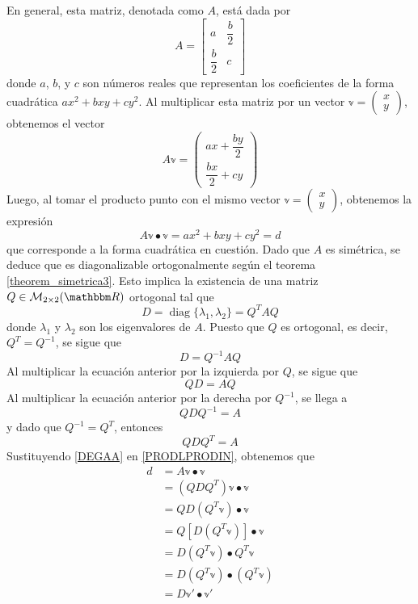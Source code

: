 En general, esta matriz, denotada como $A$, está dada por
\begin{equation}
    A = \begin{bmatrix} a & \dfrac{b}{2} \\[1.5mm] \dfrac{b}{2} & c \end{bmatrix} \label{AMATSIM}
\end{equation}
donde $a$, $b$, y $c$ son números reales que representan los coeficientes de la forma cuadrática $ax^2 + bxy + cy^2$. Al multiplicar esta matriz por un vector $\mathbb{v} = \begin{pmatrix} x \\ y \end{pmatrix}$, obtenemos el vector
$$A\mathbb{v} = \begin{pmatrix} ax + \dfrac{by}{2} \\[2mm] \dfrac{bx}{2} + cy \end{pmatrix}$$
Luego, al tomar el producto punto con el mismo vector $\mathbb{v} = \begin{pmatrix} x \\ y \end{pmatrix}$, obtenemos la expresión
\begin{equation}
    A\mathbb{v} \bullet \mathbb{v} = ax^2 + bxy + cy^2 = d \label{PRODLPRODIN}
\end{equation}
que corresponde a la forma cuadrática en cuestión. Dado que $A$ es simétrica, se deduce que es diagonalizable ortogonalmente según el teorema \ref{theorem_simetrica3}. Esto implica la existencia de una matriz $Q \in \mathcal{M}_{2 \times 2}(\RR)$ ortogonal tal que
$$D = \operatorname{diag} \{ \lambda_1, \lambda_2 \} = Q^T A Q$$\newpage\noindent
donde $\lambda_1$ y $\lambda_2$ son los eigenvalores de $A$. Puesto que $Q$ es ortogonal, es decir, $Q^T = Q^{-1}$, se sigue que
$$D = Q^{-1}AQ$$
Al multiplicar la ecuación anterior por la izquierda por $Q$, se sigue que
$$QD = AQ$$
Al multiplicar la ecuación anterior por la derecha por $Q^{-1}$, se llega a
$$QDQ^{-1} = A$$
y dado que $Q^{-1} = Q^T$, entonces
\begin{equation}
    QDQ^T = A \label{DEGAA}
\end{equation}
Sustituyendo \eqref{DEGAA} en \eqref{PRODLPRODIN}, obtenemos que
\begin{align*}
    d & = A\mathbb{v} \bullet \mathbb{v} \\
    & = \left( QDQ^T \right) \mathbb{v} \bullet \mathbb{v} \\
    & = QD \left( Q^T \mathbb{v} \right) \bullet \mathbb{v} \\
    & = Q \left[ D \left( Q^T \mathbb{v} \right) \right] \bullet \mathbb{v} \\
    & = D \left( Q^T \mathbb{v} \right) \bullet Q^T \mathbb{v} \\
    & = D \left( Q^T \mathbb{v} \right) \bullet \left( Q^T \mathbb{v} \right) \\
    & = D \mathbb{v}' \bullet \mathbb{v}'
\end{align*}
